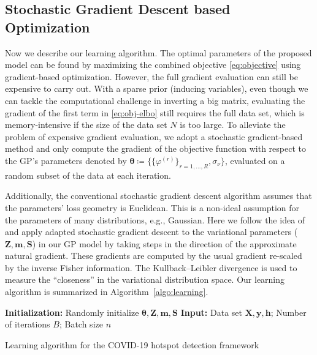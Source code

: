 \documentclass[journal]{IEEEtran}
\begin{document}
\subsection{Stochastic Gradient Descent based Optimization}

Now we describe our learning algorithm. The optimal parameters of the proposed model can be found by maximizing the combined objective \eqref{eq:objective} using gradient-based optimization.
However, the full gradient evaluation can still be expensive to carry out. 
With a sparse prior (inducing variables), even though we can tackle the computational challenge in inverting a big matrix, evaluating the gradient of the first term in \eqref{eq:obj-elbo} still requires the full data set, which is memory-intensive if the size of the data set $N$ is too large.
To alleviate the problem of expensive gradient evaluation, we adopt a stochastic gradient-based method \cite{hensman2013gaussian} and only compute the gradient of the objective function with respect to the GP's parameters denoted by $\boldsymbol{\theta} \coloneqq \{\{\varphi^{(r)}\}_{r=1,\dots,R}, \sigma_\nu\}$, evaluated on a random subset of the data at each iteration. 

Additionally, the conventional stochastic gradient descent algorithm assumes that the parameters' loss geometry is Euclidean. 
This is a non-ideal assumption for the parameters of many distributions, e.g., Gaussian. 
Here we follow the idea of \cite{hensman2013gaussian, martens2014new} and apply adapted stochastic gradient descent to the variational parameters ($\mathbf{Z}, \mathbf{m}, \mathbf{S}$) in our GP model by taking steps in the direction of the approximate natural gradient.
These gradients are computed by the usual gradient re-scaled by the inverse Fisher information. The Kullback–Leibler divergence is used to measure the ``closeness'' in the variational distribution space.
Our learning algorithm is summarized in Algorithm~\ref{algo:learning}.

\begin{algorithm}[!t]
\SetAlgoLined
    {\bfseries Initialization:} Randomly initialize $\boldsymbol{\theta}, \mathbf{Z}, \mathbf{m}, \mathbf{S}$\;
    {\bfseries Input:} Data set $\mathbf{X}, \mathbf{y}, \mathbf{h}$; Number of iterations $B$; Batch size $n$\;
\caption{Learning algorithm for the COVID-19 hotspot detection framework}
\label{algo:learning}
\end{algorithm}
\end{document}
